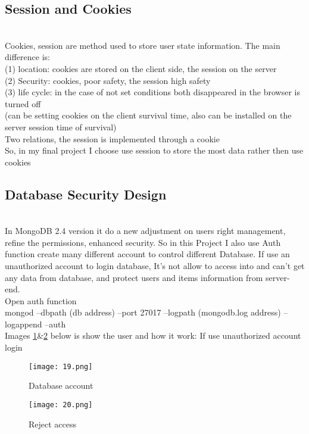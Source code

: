 \subsection{Session and Cookies}\cite{session}
\\
Cookies, session are method used to store user state information.
The main difference is:\\
(1) location: cookies are stored on the client side, the session on the server\\
(2) Security: cookies, poor safety, the session high safety\\
(3) life cycle: in the case of not set conditions both disappeared in the browser is turned off\\
(can be setting cookies on the client survival time, also can be installed on the server session time of survival)\\
Two relations, the session is implemented through a cookie
\\
So, in my final project I choose use session to store the most data rather then use cookies
\\
\subsection{Database Security Design}
\\
In MongoDB 2.4 version it do a new adjustment on users right management, refine the permissions, enhanced security.
So in this Project I also use Auth function create many different account to control different Database.
If use an unauthorized account to login database, It’s not allow to access into and can’t get any data from database, and protect users and items information from server-end.
\\
Open auth function\\
mongod --dbpath (db address) --port 27017  --logpath (mongodb.log address) --logappend --auth
\\
Images \ref{fig:8 cubed graph}\&\ref{fig:9 cubed graph} below is show the user and how it work:
If use unauthorized account login
 \\
 \begin{figure}[h]
 	\centering
 	\texttt{[image: 19.png]}
 	\caption{Database account}
 	\label{fig:8 cubed graph}
 \end{figure}
 
\begin{figure}[h]
	\centering
	\texttt{[image: 20.png]}
	\caption{Reject access}
	\label{fig:9 cubed graph}
\end{figure}
 \\
